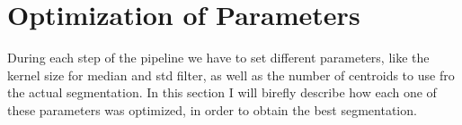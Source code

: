 \documentclass{standalone}
\begin{document}
	\section{Optimization of Parameters}
	
	During each step of the pipeline we have to set different parameters, like the kernel size for median and std filter, as well as the number of centroids to use fro the actual segmentation. In this section I will birefly describe how each one of these parameters was optimized, in order to obtain the best segmentation.
\end{document}
